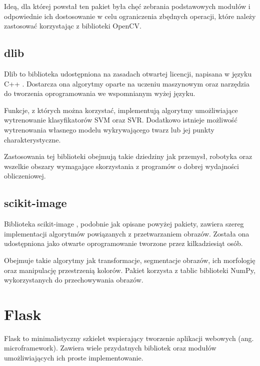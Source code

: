 Ideą, dla której powstał ten pakiet była chęć zebrania podstawowych modułów i odpowiednie ich dostosowanie w celu ograniczenia zbędnych operacji, które należy zastosować korzystając z biblioteki OpenCV.


\subsection{dlib}
Dlib to biblioteka udostępniona na zasadach otwartej licencji, napisana w języku C++ \cite{dlib}. Dostarcza ona algorytmy oparte na uczeniu maszynowym oraz narzędzia do tworzenia oprogramowania we wspomnianym wyżej języku. 

Funkcje, z których można korzystać, implementują algorytmy umożliwiające wytrenowanie klasyfikatorów SVM oraz SVR. Dodatkowo istnieje możliwość wytrenowania własnego modelu wykrywającego twarz lub jej punkty charakterystyczne.

Zastosowania tej biblioteki obejmują takie dziedziny jak przemysł, robotyka oraz wszelkie obszary wymagające skorzystania z programów o dobrej wydajności obliczeniowej.


\subsection{scikit-image}
Biblioteka scikit-image \cite{skimage}, podobnie jak opisane powyżej pakiety, zawiera szereg implementacji algorytmów powiązanych z przetwarzaniem obrazów. Została ona udostępniona jako otwarte oprogramowanie tworzone przez kilkadziesiąt osób. 

Obejmuje takie algorytmy jak transformacje, segmentacje obrazów, ich morfologię oraz manipulację przestrzenią kolorów. Pakiet korzysta z tablic biblioteki NumPy, wykorzystanych do przechowywania obrazów.


\section{Flask}
Flask \cite{flask} to minimalistyczny szkielet wspierający tworzenie aplikacji webowych (ang. microframework). Zawiera wiele przydatnych bibliotek oraz modułów umożliwiających ich proste implementowanie.

